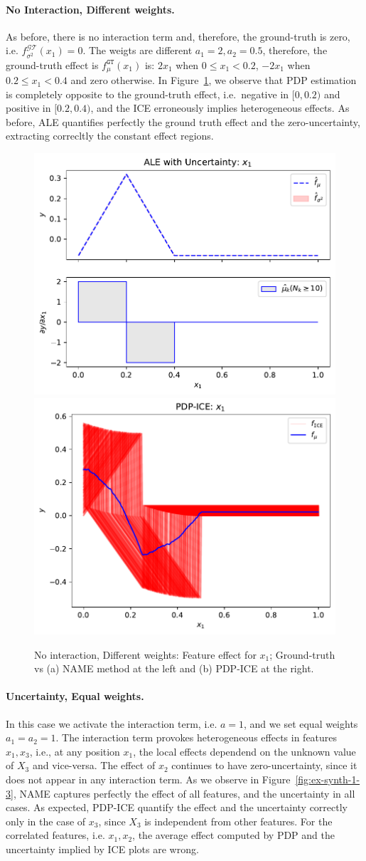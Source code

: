 \documentclass[twoside]{article}
\begin{document}
\paragraph{No Interaction, Different weights.}

As before, there is no interaction term and, therefore, the
ground-truth is zero, i.e.  \(f^{\mathcal{GT}}_{\sigma^2}(x_1) =
0\). The weigts are different \(a_1=2, a_2=0.5\), therefore, the
ground-truth effect is \(f_\mu^{\mathtt{GT}}(x_1)\) is: \(2x_1\) when
\(0 \leq x_1 < 0.2\), \(-2x_1\) when \(0.2 \leq x_1 < 0.4\) and zero
otherwise. In Figure~\ref{fig:ex-synth-1-2}, we observe that PDP
estimation is completely opposite to the ground-truth effect,
i.e.~negative in \([0, 0.2)\) and positive in \([0.2, 0.4)\), and the
ICE erroneously implies heterogeneous effects.  As before, ALE
quantifies perfectly the ground truth effect and the zero-uncertainty,
extracting correcltly the constant effect regions.

\begin{figure}[h]
  \centering
  \includegraphics[width=.23\textwidth]{example_2/dale_feat_0.pdf}
  \includegraphics[width=.23\textwidth]{example_2/pdp_ice_feat_0.pdf}
  \caption{No interaction, Different weights: Feature effect for \(x_1\);
    Ground-truth vs (a) NAME method at the left and (b) PDP-ICE at the
    right.}
  \label{fig:ex-synth-1-2}
\end{figure}

\paragraph{Uncertainty, Equal weights.}

In this case we activate the interaction term, i.e. \(a=1\), and we
set equal weights \(a_1=a_2=1\). The interaction term provokes
heterogeneous effects in features \(x_1, x_3\), i.e., at any position
\(x_1\), the local effects dependend on the unknown value of \(X_3\)
and vice-versa. The effect of \(x_2\) continues to have
zero-uncertainty, since it does not appear in any interaction term. As
we observe in Figure~\ref{fig:ex-synth-1-3}, NAME captures perfectly
the effect of all features, and the uncertainty in all cases. As
expected, PDP-ICE quantify the effect and the uncertainty correctly
only in the case of \(x_3\), since \(X_3\) is independent from other
features. For the correlated features, i.e. \(x_1, x_2\), the average
effect computed by PDP and the uncertainty implied by ICE plots are
wrong.
\end{document}
